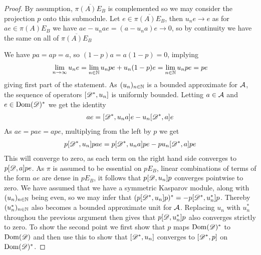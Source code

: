 \begin{proof}
	By assumption, $\overline{\pi(A)E_B}$ is complemented so we may consider the projection $p$ onto this submodule. Let $e\in \overline{\pi(A)E_B}$, then $u_ne\to e$ as for $ae\in \pi(A)E_B$ we have $ae-u_nae=(a-u_na)e\to 0$, so by continuity we have the same on all of $\overline{\pi(A)E_B}$

	We have $pa=ap=a$, so $(1-p)a=a(1-p)=0$, implying 
	\begin{align*}
		\lim_{n\to \infty} u_n e=\lim_{n\in \mathbb{N}} u_n pe+u_n(1-p)e=\lim_{n\in \mathbb{N}} u_n pe=pe
	\end{align*}
	giving first part of the statement. As $(u_n)_{n\in \mathbb{N}}$ is a bounded approximate for $\mathcal{A}$, the sequence of operators $[\mathscr{D}^*,u_n]$ is uniformly bounded. Letting $a\in \mathcal{A}$ and $e\in \operatorname{Dom}(\mathscr{D})^*$ we get the identity 
	\begin{align*}
		[\D^*,u_n]ae=[\D^*,u_na]e-u_n[\D^*,a]e
	\end{align*}
	As $ae=pae=ape$, multiplying from the left by $p$ we get
	\begin{align*}
		p[\mathscr{D}^*,u_n]pae=p[\mathscr{D}^*,u_na]pe-pu_n[\mathscr{D}^*,a]pe
	\end{align*}
	This will converge to zero, as each term on the right hand side converges to $p[\mathscr{D},a]pe$. As $\pi$ is assumed to be essential on $pE_B$, linear combinations of terms of the form $ae$ are dense in $pE_B$, it follows that $p[\mathscr{D},u_n]p$ converges pointwise to zero. We have assumed that we have a symmetric Kasparov module, along with $(u_n)_{n\in \mathbb{N}}$ being even, so we may infer that $(p[\mathscr{D}^*,u_n]p)^*=-p[\mathscr{D}^*,u_n^*]p$. Thereby $(u_n^*)_{n\in \mathbb{N}}$ also becomes a bounded approximate unit for $\mathcal{A}$. Replacing $u_n$ with $u_n^*$ throughou the previous argument then gives that $p[\mathscr{D},u_n^*]p$ also converges strictly to zero. 
	To show the second point we first show that $p$ maps $\operatorname{Dom}(\mathscr{D})^*$ to $\operatorname{Dom}(\mathscr{D})$ and then use this to show that $[\mathscr{D}^*,u_n]$ converges to $[\mathscr{D}^*,p]$ on $\operatorname{Dom}(\mathscr{D})^*$. 
	

\end{proof}
